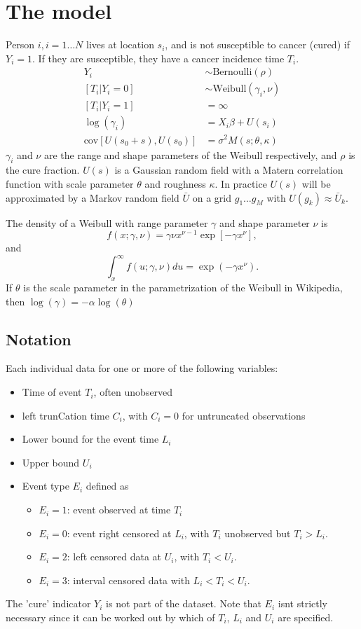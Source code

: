 \documentclass{article}
\begin{document}
\section{The model}
Person $i, i=1\ldots N$ lives at location $s_i$, and is not susceptible to cancer (cured) if $Y_i=1$.  If they are susceptible, they have a cancer incidence time $T_i$.
\begin{align*}
Y_i & \sim \text{Bernoulli}(\rho)\\
[T_i | Y_i = 0] &\sim \text{Weibull}(\gamma_i, \nu)\\
[T_i | Y_i = 1] & = \infty \\
\log(\gamma_i) &= X_i \beta + U(s_i)\\
\text{cov}[U(s_0 + s), U(s_0)] &= \sigma^2 M(s; \theta, \kappa) 
\end{align*}
$\gamma_i$ and $\nu$ are the range and shape parameters of the Weibull respectively, and $\rho$ is the cure fraction.  $U(s)$ is a Gaussian random field with a Matern correlation function with scale parameter $\theta$ and roughness $\kappa$.  In practice $U(s)$ will be approximated by a Markov random field $\bar U$ on a grid $g_1 \ldots g_M$ with $U(g_k) \approx \bar U_k$.



The density of a Weibull with range parameter $\gamma$ and shape parameter $\nu$ is 
\[
f(x;\gamma,\nu) =  \gamma \nu x^{\nu-1} \exp\left[-	\gamma x^\nu\right],
\]
and
\[
\int_x^\infty f(u;\gamma,\nu)du = \exp(-\gamma x^\nu).
\]
If $\theta$ is the scale parameter in the parametrization of the Weibull in Wikipedia, then 
$\log(\gamma) = -\alpha\log(\theta)$


\subsection{Notation}

Each individual data for one or more of the following variables:
\begin{itemize}
\item Time of event $T_i$, often unobserved
	\item left trunCation time $C_i$, with $C_i=0$ for untruncated observations
\item Lower bound for the event time $L_i$
\item Upper bound $U_i$
\item Event type $E_i$ defined as
\begin{itemize}
	\item $E_i=1$: event observed at time $T_i$
	\item $E_i=0$: event right censored at $L_i$, with $T_i$ unobserved but $T_i >L_i$.
	\item $E_i=2$: left censored data at $U_i$, with $T_i < U_i$.
	\item $E_i=3$: interval censored data with $L_i < T_i < U_i$. 
\end{itemize}
\end{itemize}
The 'cure' indicator $Y_i$ is not part of the dataset.  Note that $E_i$ isnt strictly necessary since it can be worked out by which of $T_i$, $L_i$ and $U_i$ are specified.
\end{document}
